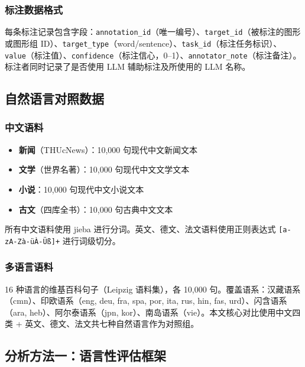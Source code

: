 \documentclass[12pt,a4paper,UTF8,fontset=founder]{ctexart}
\begin{document}
\subsubsection{标注数据格式}\label{ux6807ux6ce8ux6570ux636eux683cux5f0f}

每条标注记录包含字段：\texttt{annotation\_id}（唯一编号）、\texttt{target\_id}（被标注的图形或图形组 ID）、\texttt{target\_type}（word/sentence）、\texttt{task\_id}（标注任务标识）、\texttt{value}（标注值）、\texttt{confidence}（标注信心，0--1）、\texttt{annotator\_note}（标注备注）。标注者同时记录了是否使用 LLM 辅助标注及所使用的 LLM 名称。

\subsection{自然语言对照数据}\label{ux81eaux7136ux8bedux8a00ux5bf9ux7167ux6570ux636e}

\subsubsection{中文语料}\label{ux4e2dux6587ux8bedux6599}

\begin{itemize}

\item
  \textbf{新闻}（THUcNews）：10,000 句现代中文新闻文本
\item
  \textbf{文学}（世界名著）：10,000 句现代中文文学文本
\item
  \textbf{小说}：10,000 句现代中文小说文本
\item
  \textbf{古文}（四库全书）：10,000 句古典中文文本
\end{itemize}

所有中文语料使用 jieba 进行分词。英文、德文、法文语料使用正则表达式 \texttt{{[}a-zA-Zà-üÀ-Üß{]}+} 进行词级切分。

\subsubsection{多语言语料}\label{ux591aux8bedux8a00ux8bedux6599}

16 种语言的维基百科句子（Leipzig 语料集），各 10,000 句。覆盖语系：汉藏语系（cmn）、印欧语系（eng, deu, fra, spa, por, ita, rus, hin, fas, urd）、闪含语系（ara, heb）、阿尔泰语系（jpn, kor）、南岛语系（vie）。本文核心对比使用中文四类 + 英文、德文、法文共七种自然语言作为对照组。

\subsection{分析方法一：语言性评估框架}\label{ux5206ux6790ux65b9ux6cd5ux4e00ux8bedux8a00ux6027ux8bc4ux4f30ux6846ux67b6}
\end{document}
